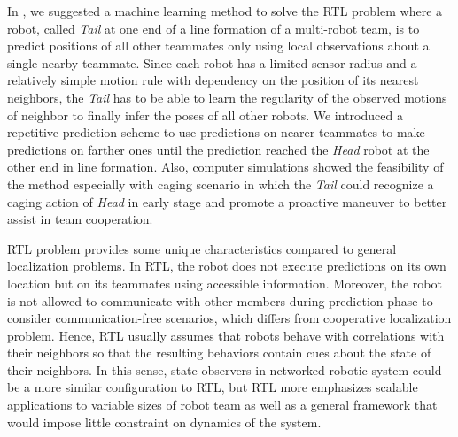\documentclass[letterpaper, 10 pt, conference]{ieeeconf}  %
\begin{document}
	In \cite{CPR17}, we suggested a machine learning method to solve the 
	RTL problem where a robot, called \emph{Tail} at one end of a line formation of 
	a multi-robot team, is to predict positions of all other teammates only using local
	observations about a single nearby teammate. Since each robot has a limited sensor
	radius and a relatively simple motion rule with dependency 
	on the position of its nearest neighbors, 
	the \emph{Tail} has to be able to learn the regularity 
	of the observed motions of neighbor to finally infer the poses of all other robots.
	We introduced a repetitive prediction scheme to use predictions on 
	nearer teammates to make predictions on farther ones until the prediction 
	reached the \emph{Head} robot at the other end in line formation. 	
	Also, computer simulations showed the feasibility of the method 
	especially with caging scenario in which the \emph{Tail} could recognize a
	caging action of \emph{Head} in early stage and promote a proactive maneuver to 
	better assist in team cooperation. 
	
	RTL problem provides some unique characteristics compared to general localization problems. 
	In RTL, the robot does not execute predictions on its own location but on  
	its teammates using accessible information.
	Moreover, the robot is not allowed to communicate with other members during 
	prediction phase to consider communication-free scenarios, which differs from 
	cooperative localization problem. 
	Hence, RTL usually assumes that robots behave with correlations with their neighbors 
	so that the resulting behaviors contain cues about the state of their neighbors. 	
	In this sense, state observers in networked robotic system could be a more similar 
	configuration to RTL, but RTL more emphasizes 
	scalable applications to variable sizes of robot team as well as a general framework 
	that would impose little constraint on dynamics of the system.
	
\end{document}
